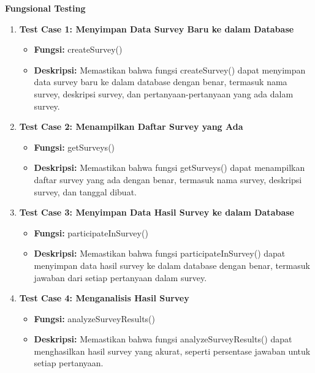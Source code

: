 \documentclass[12pt]{article}
\begin{document}

\textbf{Fungsional Testing}

\begin{enumerate}
    \item \textbf{Test Case 1: Menyimpan Data Survey Baru ke dalam Database}
        \begin{itemize}
            \item \textbf{Fungsi:} createSurvey()
            \item \textbf{Deskripsi:} Memastikan bahwa fungsi createSurvey() dapat menyimpan data survey baru ke dalam database dengan benar, termasuk nama survey, deskripsi survey, dan pertanyaan-pertanyaan yang ada dalam survey.
        \end{itemize}
    
    \item \textbf{Test Case 2: Menampilkan Daftar Survey yang Ada}
        \begin{itemize}
            \item \textbf{Fungsi:} getSurveys()
            \item \textbf{Deskripsi:} Memastikan bahwa fungsi getSurveys() dapat menampilkan daftar survey yang ada dengan benar, termasuk nama survey, deskripsi survey, dan tanggal dibuat.
        \end{itemize}
    
    \item \textbf{Test Case 3: Menyimpan Data Hasil Survey ke dalam Database}
        \begin{itemize}
            \item \textbf{Fungsi:} participateInSurvey()
            \item \textbf{Deskripsi:} Memastikan bahwa fungsi participateInSurvey() dapat menyimpan data hasil survey ke dalam database dengan benar, termasuk jawaban dari setiap pertanyaan dalam survey.
        \end{itemize}
    
    \item \textbf{Test Case 4: Menganalisis Hasil Survey}
        \begin{itemize}
            \item \textbf{Fungsi:} analyzeSurveyResults()
            \item \textbf{Deskripsi:} Memastikan bahwa fungsi analyzeSurveyResults() dapat menghasilkan hasil survey yang akurat, seperti persentase jawaban untuk setiap pertanyaan.
        \end{itemize}
\end{enumerate}
\end{document}
